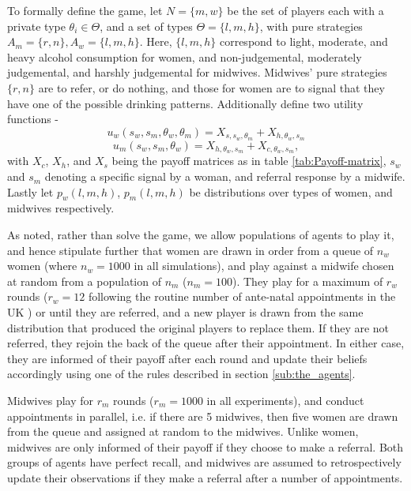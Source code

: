 To formally define the game, let \(N = \{m, w\}\) be the set of players each with a private type \(\theta_{i} \in \Theta\), and a set of types \(\Theta=\{l, m, h\}\), with pure strategies \(A_{m}=\{r,n\}, A_{w}=\{l, m, h\}\). Here, \(\{l, m, h\}\) correspond to light, moderate, and heavy alcohol consumption for women, and non-judgemental, moderately judgemental, and harshly judgemental for midwives. Midwives' pure strategies \(\{r,n\}\) are to refer, or do nothing, and those for women are to signal that they have one of the possible drinking patterns.
Additionally define two utility functions - 
\begin{equation}
u_{w}(s_{w}, s_{m}, \theta_{w}, \theta_{m})=X_{s, s_{w}, \theta_{m}} + X_{h, \theta_{w}, s_{m}}
\end{equation} 
\begin{equation}
u_{m}(s_{w}, s_{m}, \theta_{w})=X_{h, \theta_{w}, s_{m}} + X_{c, \theta_{w}, s_{m}},
\end{equation} with $X_{c}$, $X_{h}$, and $X_{s}$ being the payoff matrices as in table \ref{tab:Payoff-matrix}, $s_{w}$ and $s_{m}$ denoting a specific signal by a woman, and referral response by a midwife. Lastly let \(p_{w}(l, m, h)\), \(p_{m}(l, m, h)\) be distributions over types of women, and midwives respectively.


As noted, rather than solve the game, we allow populations of agents to play it, and hence stipulate further that women are drawn in order from a queue of \(n_{w}\) women (where \(n_{w}=1000\) in all simulations), and play against a midwife chosen at random from a population of \(n_{m}\) (\(n_{m}=100\)). They play for a maximum of \(r_{w}\) rounds (\(r_{w}=12\) following the routine number of ante-natal appointments in the UK \citep{NICE2010a}) or until they are referred, and a new player is drawn from the same distribution that produced the original players to replace them. If they are not referred, they rejoin the back of the queue after their appointment. In either case, they are informed of their payoff after each round and update their beliefs accordingly using one of the rules described in section \ref{sub:the_agents}.

Midwives play for \(r_{m}\) rounds (\(r_{m}=1000\) in all experiments), and conduct appointments in parallel, i.e. if there are 5 midwives, then five women are drawn from the queue and assigned at random to the midwives. 
Unlike women, midwives are only informed of their payoff if they choose to make a referral. Both groups of agents have perfect recall, and midwives are assumed to retrospectively update their observations if they make a referral after a number of appointments.


